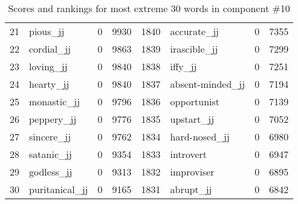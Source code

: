 \begin{table}[tbp]
\begin{tabular}{| rlr@{.}l | rlr@{.}l |}
    21 & pious\_jj & 0 & 9930    &    1840 & accurate\_jj & 0 & 7355 \\
    22 & cordial\_jj & 0 & 9863    &    1839 & irascible\_jj & 0 & 7299 \\
    23 & loving\_jj & 0 & 9840    &    1838 & iffy\_jj & 0 & 7251 \\
    24 & hearty\_jj & 0 & 9840    &    1837 & absent-minded\_jj & 0 & 7194 \\
    25 & monastic\_jj & 0 & 9796    &    1836 & opportunist & 0 & 7139 \\
    26 & peppery\_jj & 0 & 9776    &    1835 & upstart\_jj & 0 & 7052 \\
    27 & sincere\_jj & 0 & 9762    &    1834 & hard-nosed\_jj & 0 & 6980 \\
    28 & satanic\_jj & 0 & 9354    &    1833 & introvert & 0 & 6947 \\
    29 & godless\_jj & 0 & 9313    &    1832 & improviser & 0 & 6895 \\
    30 & puritanical\_jj & 0 & 9165    &    1831 & abrupt\_jj & 0 & 6842 \\
    \hline
    \end{tabular}
    \caption{Scores and rankings for most extreme 30 words in component \#10} 
\end{table}
\clearpage
